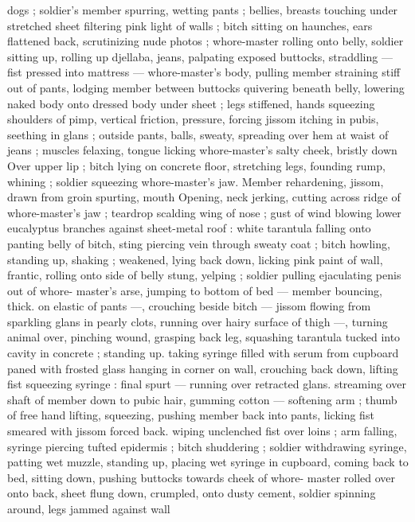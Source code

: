 dogs ; soldier's member spurring, wetting pants ; bellies, breasts 
touching under stretched sheet filtering pink light of walls ; bitch 
sitting on haunches, ears flattened back, scrutinizing nude photos ; 
whore-master rolling onto belly, soldier sitting up, rolling up djellaba, 
jeans, palpating exposed buttocks, straddling --- fist pressed into 
mattress --- whore-master's body, pulling member straining stiff out 
of pants, lodging member between buttocks quivering beneath belly, 
lowering naked body onto dressed body under sheet ; legs stiffened, 
hands squeezing shoulders of pimp, vertical friction, pressure, 
forcing jissom itching in pubis, seething in glans ; outside pants, 
balls, sweaty, spreading over hem at waist of jeans ; muscles 
felaxing, tongue licking whore-master's salty cheek, bristly down 
Over upper lip ; bitch lying on concrete floor, stretching legs, 
founding rump, whining ; soldier squeezing whore-master's jaw. 
Member rehardening, jissom, drawn from groin spurting, mouth 
Opening, neck jerking, cutting across ridge of whore-master's jaw ; 
teardrop scalding wing of nose ; gust of wind blowing lower 
eucalyptus branches against sheet-metal roof : white tarantula 
falling onto panting belly of bitch, sting piercing vein through sweaty 
coat ; bitch howling, standing up, shaking ; weakened, lying back 
down, licking pink paint of wall, frantic, rolling onto side of belly 
stung, yelping ; soldier pulling ejaculating penis out of whore- 
master's arse, jumping to bottom of bed --- member bouncing, thick. 
on elastic of pants ---, crouching beside bitch --- jissom flowing from 
sparkling glans in pearly clots, running over hairy surface of thigh 
---, turning animal over, pinching wound, grasping back leg, 
squashing tarantula tucked into cavity in concrete ; standing up. 
taking syringe filled with serum from cupboard paned with frosted 
glass hanging in corner on wall, crouching back down, lifting fist 
squeezing syringe : final spurt --- running over retracted glans. 
streaming over shaft of member down to pubic hair, gumming cotton 
--- softening arm ; thumb of free hand lifting, squeezing, pushing 
member back into pants, licking fist smeared with jissom forced back. 
wiping unclenched fist over loins ; arm falling, syringe piercing tufted 
epidermis ; bitch shuddering ; soldier withdrawing syringe, patting 
wet muzzle, standing up, placing wet syringe in cupboard, coming 
back to bed, sitting down, pushing buttocks towards cheek of whore- 
master rolled over onto back, sheet flung down, crumpled, onto 
dusty cement, soldier spinning around, legs jammed against wall 
